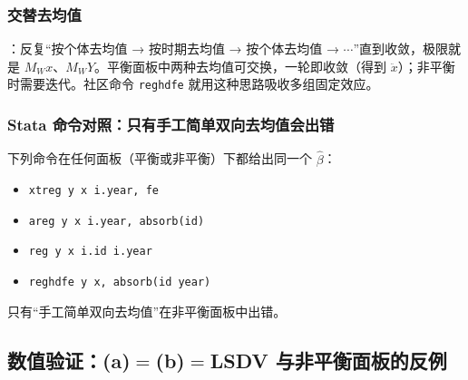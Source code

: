\subsubsection{交替去均值}
：反复“按个体去均值 → 按时期去均值 → 按个体去均值 → $\cdots$”直到收敛，极限就是 $M_Wx$、$M_WY$。平衡面板中两种去均值可交换，一轮即收敛（得到 $\ddot x$）；非平衡时需要迭代。社区命令 \texttt{reghdfe} 就用这种思路吸收多组固定效应。

\subsubsection{Stata 命令对照：只有手工简单双向去均值会出错}
下列命令在任何面板（平衡或非平衡）下都给出同一个 $\hat\beta$：
\begin{itemize}
  \item \texttt{xtreg y x i.year, fe}
  \item \texttt{areg y x i.year, absorb(id)}
  \item \texttt{reg y x i.id i.year}
  \item \texttt{reghdfe y x, absorb(id year)}
\end{itemize}
只有“手工简单双向去均值”在非平衡面板中出错。

\subsection{数值验证：(a)\texorpdfstring{$=$}{=}(b)\texorpdfstring{$=$}{=}LSDV 与非平衡面板的反例}

